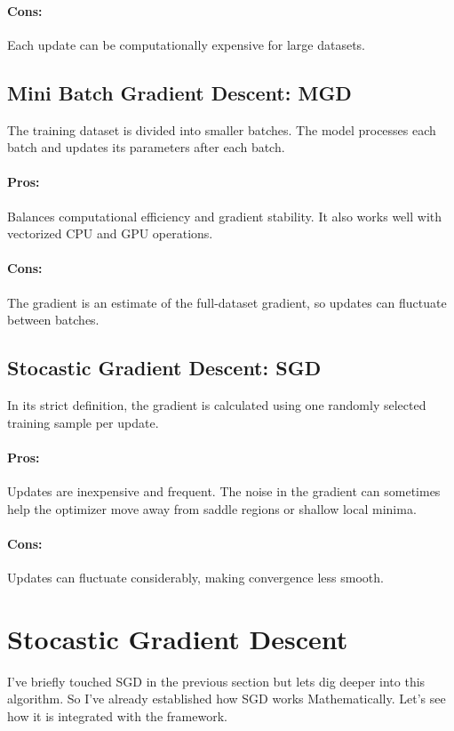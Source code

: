 \paragraph{Cons:} Each update can be
computationally expensive for large
datasets.

\subsection{Mini Batch Gradient Descent: MGD}
The training dataset is divided into smaller
batches. The model processes each batch and
updates its parameters after each batch.


\paragraph{Pros:} Balances computational
efficiency and gradient stability. It
also works well with vectorized CPU and
GPU operations.

\paragraph{Cons:} The gradient is an
estimate of the full-dataset gradient,
so updates can fluctuate between batches.
\subsection{Stocastic Gradient Descent: SGD}
In its strict definition, the gradient is
calculated using one randomly selected
training sample per update.


\paragraph{Pros:} Updates are inexpensive and
frequent. The noise in the gradient can
sometimes help the optimizer move away
from saddle regions or shallow local minima.

\paragraph{Cons:} Updates can fluctuate
considerably, making convergence less
smooth.

\section{Stocastic Gradient Descent}
\label{Optimizer::SGD}

I've briefly touched SGD in the previous
section but lets dig deeper into this
algorithm. So I've already established
how SGD works Mathematically. Let's see
how it is integrated with the framework.



